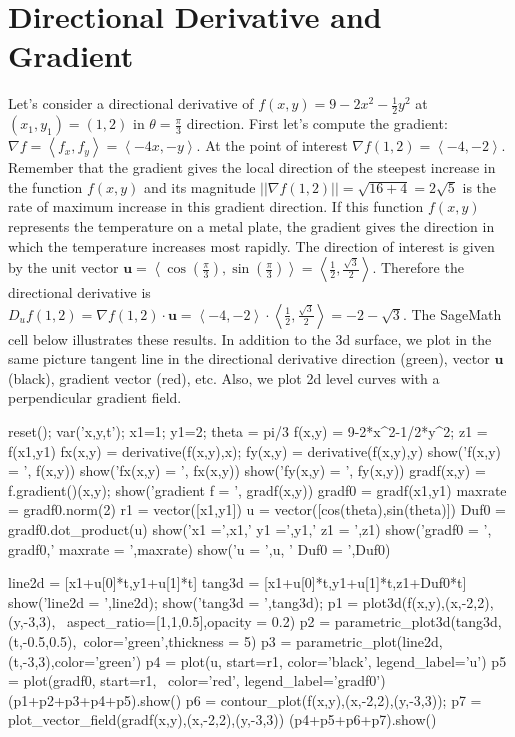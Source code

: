 \section{Directional Derivative and Gradient}

Let's consider a directional derivative of $f(x,y) = 9-2x^2-\frac{1}{2}y^2$ at $(x_1,y_1)=(1,2)$ in $\theta=\frac{\pi}{3}$ direction.    First let's compute the gradient: $\nabla f = \left< f_x,f_y \right> =  \left< -4x, -y \right>$.  At the point of interest $\nabla f (1,2) =  \left< -4, -2 \right>$.   Remember that the gradient gives the local direction of the steepest increase in the function $f(x,y)$ and its magnitude $||\nabla f (1,2)|| = \sqrt{16+4}=2\sqrt{5}$ is the rate of maximum increase in this gradient direction.   If this function $f(x,y)$ represents the temperature on a metal plate, the gradient gives the direction in which the temperature increases most rapidly. The direction of interest is given by the unit vector $\mathbf{u} =\left< \cos\left(\frac{\pi}{3} \right), \sin\left(\frac{\pi}{3} \right) \right> = \left< \frac{1}{2}, \frac{\sqrt{3}}{2} \right>$.    Therefore the directional derivative is $D_uf(1,2) =\nabla f (1,2) \cdot \mathbf{u} =  \left< -4, -2 \right> \cdot \left< \frac{1}{2}, \frac{\sqrt{3}}{2} \right> = -2 - \sqrt{3}$.   The SageMath cell below illustrates these results.  In addition to the 3d surface, we plot in the same picture tangent line in the directional derivative direction (green), vector $\mathbf{u}$ (black), gradient vector (red), etc.   Also, we plot 2d level curves with a perpendicular gradient field.


reset(); var('x,y,t'); x1=1; y1=2; theta = pi/3
f(x,y) = 9-2*x^2-1/2*y^2;  z1 = f(x1,y1)
fx(x,y) = derivative(f(x,y),x);  
fy(x,y) = derivative(f(x,y),y)
show('f(x,y)  = ', f(x,y))
show('fx(x,y) = ', fx(x,y))
show('fy(x,y) = ', fy(x,y))
gradf(x,y) = f.gradient()(x,y);  
show('gradient f = ', gradf(x,y))
gradf0 = gradf(x1,y1)
maxrate = gradf0.norm(2)
r1 = vector([x1,y1])
u = vector([cos(theta),sin(theta)])
Duf0 = gradf0.dot_product(u)
show('x1 =',x1,' y1 =',y1,' z1 = ',z1)
show('gradf0 = ', gradf0,'  maxrate = ',maxrate)
show('u = ',u, '  Duf0 = ',Duf0)

line2d = [x1+u[0]*t,y1+u[1]*t]
tang3d = [x1+u[0]*t,y1+u[1]*t,z1+Duf0*t]
show('line2d = ',line2d);  
show('tang3d = ',tang3d);  
p1 = plot3d(f(x,y),(x,-2,2),(y,-3,3), \
       aspect_ratio=[1,1,0.5],opacity = 0.2)
p2 = parametric_plot3d(tang3d,(t,-0.5,0.5),\
               color='green',thickness = 5) 
p3 = parametric_plot(line2d,(t,-3,3),color='green')
p4 = plot(u, start=r1, color='black', legend_label='u') 
p5 = plot(gradf0, start=r1, \
          color='red', legend_label='gradf0') 
(p1+p2+p3+p4+p5).show()
p6 = contour_plot(f(x,y),(x,-2,2),(y,-3,3)); 
p7 = plot_vector_field(gradf(x,y),(x,-2,2),(y,-3,3))
(p4+p5+p6+p7).show()

